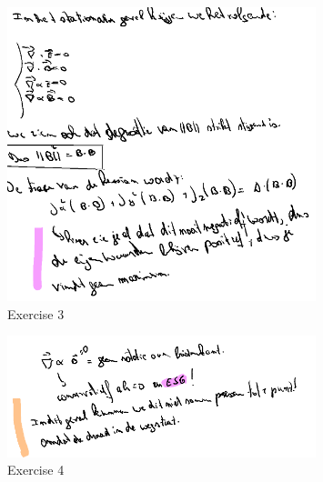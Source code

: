 \documentclass[a4paper]{report}
\begin{document}
\begin{figure}[H]
	\centering
	\includegraphics[width=0.8\textwidth]{assets/huis_6_ex_3.png}
	\caption{Exercise 3}
	\label{fig:huis_6_ex_3}
\end{figure}


\begin{figure}[H]
	\centering
	\includegraphics[width=0.8\textwidth]{assets/huis_6_ex_4.png}
	\caption{Exercise 4}
	\label{fig:huis_6_ex_4}
\end{figure}
\end{document}
